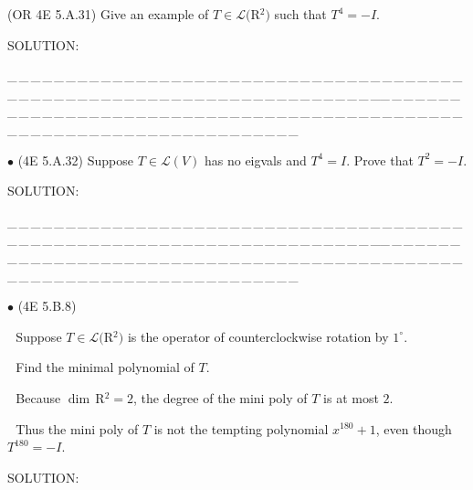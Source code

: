\documentclass[a4paper, 11pt, UTF8]{article}
\def\Lm{\mathcal{L}}
\def\Rbfc{$\,{\timesbf R}$}
\begin{document}
\begin{large}
{\Large{}} (\normalsize{O{\small R} 4E 5.A.31}) {\timessl\Large 
Give an example of $T\in\Lm(${\timesbf R}$^2)$ such that $T^4=-I$.}\par
{\timesbf S\footnotesize{OLUTION:}}\par\quad

\par
{\tiny \_\,\_\,\_\,\_\,\_\,\_\,\_\,\_\,\_\,\_\,\_\,\_\,\_\,\_\,\_\,\_\,\_\,\_\,\_\,\_\,\_\,\_\,\_\,\_\,\_\,\_\,\_\,\_\,\_\,\_\,\_\,\_\,\_\,\_\,\_\,\_\,\_\,\_\,\_\,\_\,\_\,\_\,\_\,\_\,\_\,\_\,\_\,\_\,\_\,\_\,\_\,\_\,\_\,\_\,\_\,\_\,\_\,\_\,\_\,\_\,\_\,\_\,\_\,\_\,\_\,\_\,\_\,\_\,\_\,\_\,\_\_\,\_\,\_\,\_\,\_\,\_\,\_\,\_\,\_\,\_\,\_\,\_\,\_\,\_\,\_\,\_\,\_\,\_\,\_\,\_\,\_\,\_\,\_\,\_\,\_\,\_\,\_\,\_\,\_\,\_\,\_\,\_\,\_\,\_\,\_\,\_\,\_\,\_\,\_\,\_\,\_\,\_\,\_\,\_\,\_\,\_\,\_\,\_\,\_\,\_\,\_\,\_\,\_\,\_\,\_\,\_\,\_\,\_\,\_\,\_\,\_\,\_\,\_\,\_\,\_\,\_\,\_\,\_\,\_\,\_\,\_}\par

{\small $\bullet$} (\normalsize{4E 5.A.32}) {\timessl\Large 
Suppose $T\in\Lm(V)$ has no eigvals and $T^4 = I$. Prove that $T^2=-I$.
}\par
{\timesbf S\footnotesize{OLUTION:}}\par\quad

\par
{\tiny \_\,\_\,\_\,\_\,\_\,\_\,\_\,\_\,\_\,\_\,\_\,\_\,\_\,\_\,\_\,\_\,\_\,\_\,\_\,\_\,\_\,\_\,\_\,\_\,\_\,\_\,\_\,\_\,\_\,\_\,\_\,\_\,\_\,\_\,\_\,\_\,\_\,\_\,\_\,\_\,\_\,\_\,\_\,\_\,\_\,\_\,\_\,\_\,\_\,\_\,\_\,\_\,\_\,\_\,\_\,\_\,\_\,\_\,\_\,\_\,\_\,\_\,\_\,\_\,\_\,\_\,\_\,\_\,\_\,\_\,\_\_\,\_\,\_\,\_\,\_\,\_\,\_\,\_\,\_\,\_\,\_\,\_\,\_\,\_\,\_\,\_\,\_\,\_\,\_\,\_\,\_\,\_\,\_\,\_\,\_\,\_\,\_\,\_\,\_\,\_\,\_\,\_\,\_\,\_\,\_\,\_\,\_\,\_\,\_\,\_\,\_\,\_\,\_\,\_\,\_\,\_\,\_\,\_\,\_\,\_\,\_\,\_\,\_\,\_\,\_\,\_\,\_\,\_\,\_\,\_\,\_\,\_\,\_\,\_\,\_\,\_\,\_\,\_\,\_\,\_\,\_}\par


{\small $\bullet$} (\normalsize{4E 5.B.8})\par\,\, {\timessl\Large 
Suppose $T\in\Lm(${\timesbf R}$^2)$ is the operator of counterclockwise rotation by $1^{\circ}$.}\par\,\,
{\timessl\Large Find the minimal polynomial of $T$.}\par\,\,
{\timessl\normalsize Because $\dim\Rbfc^2 = 2$, the degree of the mini poly of $T$ is at most $2$.}\par\,\,
{\timessl\normalsize Thus the mini poly of $T$ is not the tempting polynomial $x^{180} + 1$, even though $T^{180} = -I$.}\par
{\timesbf S\footnotesize{OLUTION:}}\par\quad


\end{large}
\end{document}
